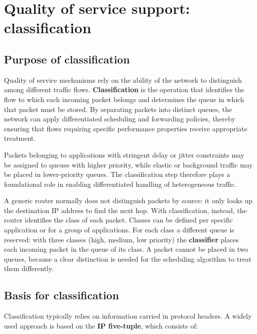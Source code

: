 \section{Quality of service support: classification}

\subsection{Purpose of classification}

Quality of service mechanisms rely on the ability of the network to distinguish among different traffic flows. \textbf{Classification} is the operation that identifies the flow to which each incoming packet belongs and determines the queue in which that packet must be stored. By separating packets into distinct queues, the network can apply differentiated scheduling and forwarding policies, thereby ensuring that flows requiring specific performance properties receive appropriate treatment.

\begin{center}
\end{center}

Packets belonging to applications with stringent delay or jitter constraints may be assigned to queues with higher priority, while elastic or background traffic may be placed in lower-priority queues. The classification step therefore plays a foundational role in enabling differentiated handling of heterogeneous traffic.

A generic router normally does not distinguish packets by source: it only looks up the destination IP address to find the next hop. With classification, instead, the router identifies the class of each packet. Classes can be defined per specific application or for a group of applications. For each class a different queue is reserved: with three classes (high, medium, low priority) the \textbf{classifier} places each incoming packet in the queue of its class. A packet cannot be placed in two queues, because a clear distinction is needed for the scheduling algorithm to treat them differently.

\subsection{Basis for classification}

Classification typically relies on information carried in protocol headers. A widely used approach is based on the \textbf{IP five-tuple}, which consists of:

